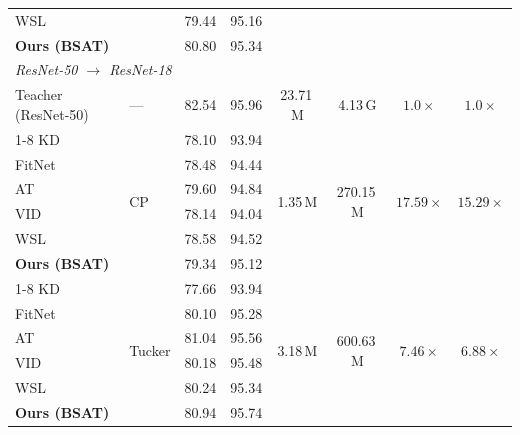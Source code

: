 \documentclass[conference]{IEEEtran}
\begin{document}
\begin{table}[t]
\begin{tabular}{llcccccc}
    WSL \cite{zhou2021rethinking}                        &                         & 79.44 & 95.16 & & & & \\
    \textbf{Ours (BSAT)}                                 &                         & 80.80 & 95.34 & & & & \\
    \midrule
    \multicolumn{8}{l}{\textit{ResNet-50 $\to$ ResNet-18}} \\
    \midrule
    Teacher (ResNet-50) & —
      & 82.54 & 95.96 & 23.71\,M & 4.13\,G & $1.0\times$ & $1.0\times$ \\
    \cline{1-8}
    KD \cite{hinton2015distilling}                       & \multirow{6}{*}{CP}     & 78.10 & 93.94 & \multirow{6}{*}{1.35\,M} & \multirow{6}{*}{270.15\,M} & \multirow{6}{*}{$17.59\times$} & \multirow{6}{*}{$15.29\times$} \\
    FitNet \cite{romero2015fitnetshintsdeepnets}         &                         & 78.48 & 94.44 & & & & \\
    AT \cite{zagoruyko2016paying}                        &                         & 79.60 & 94.84 & & & & \\
    VID \cite{ahn2019variational}                        &                         & 78.14 & 94.04 & & & & \\
    WSL \cite{zhou2021rethinking}                        &                         & 78.58 & 94.52 & & & & \\
    \textbf{Ours (BSAT)}                                 &                         & 79.34 & 95.12 & & & & \\
    \cline{1-8}
    KD \cite{hinton2015distilling}                       & \multirow{6}{*}{Tucker} & 77.66 & 93.94 & \multirow{6}{*}{3.18\,M} & \multirow{6}{*}{600.63\,M} & \multirow{6}{*}{$7.46\times$} & \multirow{6}{*}{$6.88\times$} \\
    FitNet \cite{romero2015fitnetshintsdeepnets}         &                         & 80.10 & 95.28 & & & & \\
    AT \cite{zagoruyko2016paying}                        &                         & 81.04 & 95.56 & & & & \\
    VID \cite{ahn2019variational}                        &                         & 80.18 & 95.48 & & & & \\
    WSL \cite{zhou2021rethinking}                        &                         & 80.24 & 95.34 & & & & \\
    \textbf{Ours (BSAT)}                                 &                         & 80.94 & 95.74 & & & & \\
    \bottomrule
  \end{tabular}
\end{table}
\end{document}
